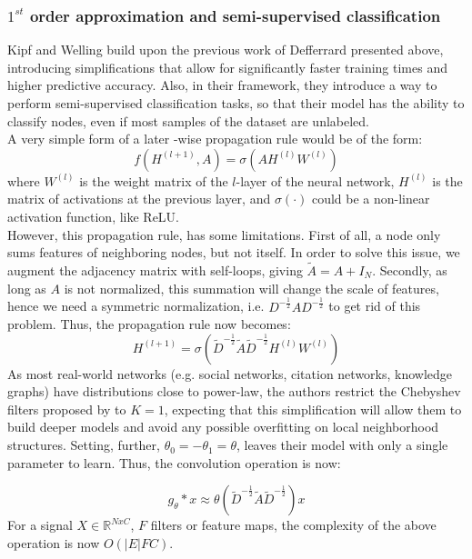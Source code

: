 \subsubsection*{$1^{st}$ order approximation and semi-supervised classification}
Kipf and Welling \cite{kipf2016semi} build upon the previous work of Defferrard
presented above, introducing simplifications that allow for significantly faster training
times and higher predictive accuracy. Also, in their framework, they introduce a
way to perform semi-supervised classification tasks, so that their model has the
ability to classify nodes, even if most samples of the dataset are unlabeled.\\
A very simple form of a later -wise propagation rule would be of the form:
\begin{equation*}
f(H^{(l+1)},A) = \sigma(AH^{(l)}W^{(l)})
\end{equation*}
where $W^{(l)}$ is the weight matrix of the $l$-layer of the neural network,
$H^{(l)}$ is the matrix of activations at the previous layer, and $\sigma(\cdot
)$ could be  a non-linear activation function, like ReLU.\\
However, this propagation rule, has some limitations. First of all, a node only
sums features of neighboring nodes, but not itself. In order to solve this issue, we augment
the adjacency matrix with self-loops, giving $\widetilde{A} = A + I_N$. Secondly, as
long as $A$ is not normalized, this summation will change the scale of features,
hence we need a symmetric normalization, i.e.
$D^{-\frac{1}{2}}AD^{-\frac{1}{2}}$ to get rid of this problem. Thus, the
propagation rule now becomes:\\
\begin{equation}
H^{(l+1)} =
\sigma(\widetilde{D}^{-\frac{1}{2}}\widetilde{A}\widetilde{D}^{-\frac{1}{2}}H^{(l)}W^{(l)})
\end{equation}
As most real-world networks (e.g. social networks, citation networks, knowledge
graphs) have distributions close to power-law, the authors restrict
the Chebyshev filters proposed by \cite{defferrard2016convolutional} to $K=1$, expecting that this
simplification will allow them to build deeper models and avoid any possible
overfitting on local neighborhood structures. Setting, further, $\theta_0 =
-\theta_1 = \theta$, leaves their model with only a single parameter to learn.
Thus, the convolution operation is now:

\[
g_\theta * x \approx \theta (\widetilde{D}^{-\frac{1}{2}}\widetilde{A}\widetilde{D}^{-\frac{1}{2}})
x
\]
For a signal $X \in \mathbb{R}^{NxC}$, $F$ filters or feature maps, the
complexity of the above operation is now $O(|E|FC)$.\\

